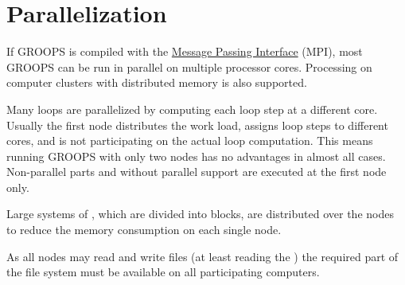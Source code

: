 \section{Parallelization}\label{general.parallelization}
If GROOPS is compiled with the
\href{https://en.wikipedia.org/wiki/Message_Passing_Interface}{Message Passing Interface} (MPI),
most GROOPS  can be run in parallel on multiple processor cores.
Processing on computer clusters with distributed memory is also supported.

Many loops are parallelized by computing each loop step at a different core.
Usually the first node distributes the work load, assigns loop steps to different cores,
and is not participating on the actual loop computation. This means running
GROOPS with only two nodes has no advantages in almost all cases.
Non-parallel parts and  without parallel support
are executed at the first node only.

Large systems of , which are divided into blocks,
are distributed over the nodes to reduce the memory consumption on each single node.

As all nodes may read and write files (at least reading the )
the required part of the file system must be available on all participating computers.
